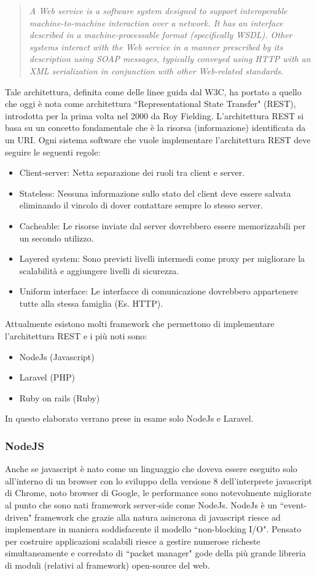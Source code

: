\begin{quotation}
\textit{A Web service is a software system designed to support interoperable machine-to-machine interaction over a network. It has an interface described in a machine-processable format (specifically WSDL). Other systems interact with the Web service in a manner prescribed by its description using SOAP messages, typically conveyed using HTTP with an XML serialization in conjunction with other Web-related standards.}
\end{quotation}
Tale architettura, definita come delle linee guida dal W3C, ha portato a quello che oggi è nota come architettura ``Representational State Transfer" (REST), introdotta per la prima volta nel 2000 da Roy Fielding. L'architettura REST si basa su un concetto fondamentale che è la risorsa (informazione) identificata da un URI. Ogni sistema software che vuole implementare l'architettura REST deve seguire le seguenti regole:
\begin{itemize}
	\item Client-server: Netta separazione dei ruoli tra client e server.
	\item Stateless: Nessuna informazione sullo stato del client deve essere salvata eliminando il vincolo di dover contattare sempre lo stesso server.
	\item Cacheable: Le risorse inviate dal server dovrebbero essere memorizzabili per un secondo utilizzo.
	\item Layered system: Sono previsti livelli intermedi come proxy per migliorare la scalabilità e aggiungere livelli di sicurezza.
	\item Uniform interface: Le interfacce di comunicazione dovrebbero appartenere tutte alla stessa famiglia (Es. HTTP).
\end{itemize}
Attualmente esistono molti framework che permettono di implementare l'architettura REST e i più noti sono:
\begin{itemize}
	\item NodeJs (Javascript)
	\item Laravel (PHP)
	\item Ruby on rails (Ruby)
\end{itemize}
In questo elaborato verrano prese in esame solo NodeJs e Laravel.
\subsubsection{NodeJS}
Anche se javascript è nato come un linguaggio che doveva essere eseguito solo all'interno di un browser con lo sviluppo della versione 8 dell'interprete javascript di Chrome, noto browser di Google, le performance sono notevolmente migliorate al punto che sono nati framework server-side come NodeJs. NodeJs è un ``event-driven" framework che grazie alla natura asincrona di javascript riesce ad implementare in maniera soddisfacente il modello ``non-blocking I/O". Pensato per costruire applicazioni scalabili riesce a gestire numerose richeste simultaneamente e corredato di ``packet manager" gode della più grande libreria di moduli (relativi al framework) open-source del web.
